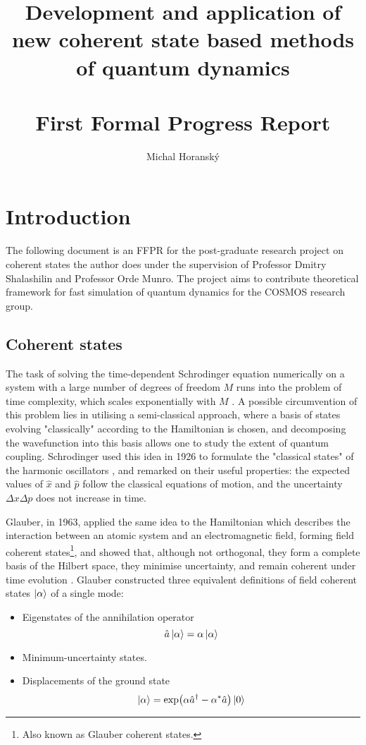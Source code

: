 \documentclass[12pt]{article}
\begin{document}
	\title{Development and application of new coherent state based methods of quantum dynamics\\\hfill\\First Formal Progress Report}
	\author{Michal Horanský}
	\maketitle
	
	\tableofcontents
	
	\section{Introduction}
	The following document is an FFPR for the post-graduate research project on coherent states the author does under the supervision of Professor Dmitry Shalashilin and Professor Orde Munro. The project aims to contribute theoretical framework for fast simulation of quantum dynamics for the COSMOS research group.
	\subsection{Coherent states}
	The task of solving the time-dependent Schrodinger equation numerically on a system with a large number of degrees of freedom $M$ runs into the problem of time complexity, which scales exponentially with $M$ \cite[Sec. 1.2]{curse_of_dimensionality}. A possible circumvention of this problem lies in utilising a semi-classical approach, where a basis of states evolving "classically" according to the Hamiltonian is chosen, and decomposing the wavefunction into this basis allows one to study the extent of quantum coupling. Schrodinger used this idea in 1926 to formulate the "classical states" of the harmonic oscillators \cite{harmonic_classical_states}, and remarked on their useful properties: the expected values of $\hat{x}$ and $\hat{p}$ follow 	the classical equations of motion, and the uncertainty $\Delta x\Delta p$ does not increase in time.
	
	Glauber, in 1963, applied the same idea to the Hamiltonian which describes the interaction between an atomic system and an electromagnetic field, forming field coherent states\footnote{Also known as Glauber coherent states.}, and showed that, although not orthogonal, they form a complete basis of the Hilbert space, they minimise uncertainty, and remain coherent under time evolution \cite{field_coherent_states}. Glauber constructed three equivalent definitions of field coherent states $\ket{\alpha}$ of a single mode:
	\begin{itemize}
		\item Eigenstates of the annihilation operator
		$$\hat{a}\ket{\alpha} = \alpha\ket{\alpha}$$
		\item Minimum-uncertainty states.
		\item Displacements of the ground state
		$$\ket{\alpha} = \exp(\alpha\hat{a}^\dagger-\alpha^*\hat{a})\ket{0}$$
	\end{itemize}
	
\end{document}
